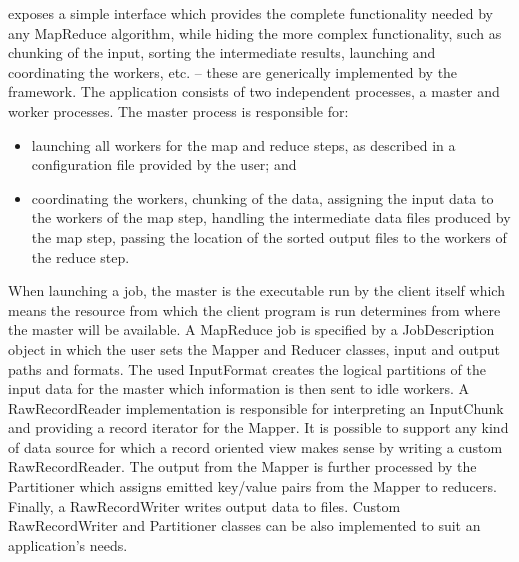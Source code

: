 \documentclass[graybox]{svmult}
\begin{document}
\smr exposes a simple interface which provides the complete
functionality needed by any MapReduce algorithm, while hiding the more
complex functionality, such as chunking of the input, sorting the
intermediate results, launching and coordinating the workers, etc. --
these are generically implemented by the framework.  The application
consists of two independent processes, a master and worker processes.
The master process is responsible for:

\begin{itemize}

 \item launching all workers for the map and reduce steps, as
 described in a configuration file provided by the user; and

 \item coordinating the workers, chunking of the data, assigning the
 input data to the workers of the map step, handling the intermediate
 data files produced by the map step, passing the location of the
 sorted output files to the workers of the reduce step.  


\end{itemize}

When launching a job, the master is the executable run by the client
itself which means the resource from which the client program is run
determines from where the master will be available.  A MapReduce job
is specified by a JobDescription object in which the user sets the
Mapper and Reducer classes, input and output paths and formats.  The
used InputFormat creates the logical partitions of the input data for
the master which information is then sent to idle workers.  A
Raw\-Record\-Reader implementation is responsible for interpreting an
InputChunk and providing a record iterator for the Mapper. It is
possible to support any kind of data source for which a record
oriented view makes sense by writing a custom Raw\-Record\-Reader.
The output from the Mapper is further processed by the Partitioner
which assigns emitted key/value pairs from the Mapper to reducers.
Finally, a Raw\-Record\-Writer writes output data to files.  Custom
Raw\-Record\-Writer and Partitioner classes can be also implemented to
suit an application's needs.  
\end{document}
